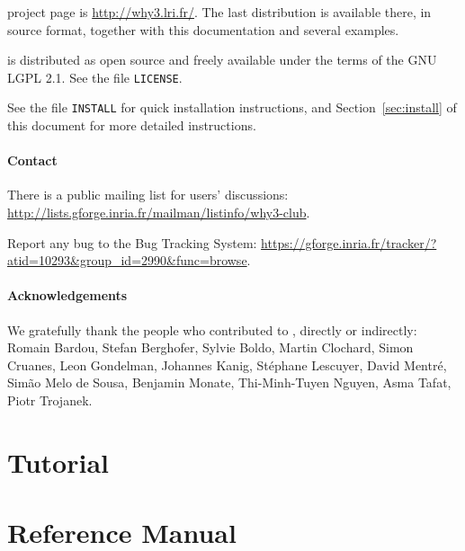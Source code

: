 \documentclass[a4paper,11pt,twoside,openright]{memoir}
\begin{document}
\why project page is \url{http://why3.lri.fr/}.  The last distribution
is available there, in source format, together with this documentation
and several examples.

\why is distributed as open source and freely available under the
terms of the GNU LGPL 2.1. See the file \texttt{LICENSE}.

See the file \texttt{INSTALL} for quick installation instructions, and
Section~\ref{sec:install} of this document for more detailed
instructions.

\subsection*{Contact}

There is a public mailing list for users' discussions:
\url{http://lists.gforge.inria.fr/mailman/listinfo/why3-club}.

Report any bug to the \why Bug Tracking System:
\url{https://gforge.inria.fr/tracker/?atid=10293&group_id=2990&func=browse}.


\subsection*{Acknowledgements}

We gratefully thank the people who contributed to \why, directly or
indirectly: Romain Bardou, Stefan Berghofer, Sylvie Boldo, Martin
Clochard, Simon Cruanes, Leon Gondelman, Johannes Kanig, St\'ephane
Lescuyer, David Mentr\'e, Sim\~ao Melo de Sousa, Benjamin Monate,
Thi-Minh-Tuyen Nguyen, Asma Tafat, Piotr Trojanek.


\cleardoublepage

\tableofcontents

%

\part{Tutorial}





% 





\part{Reference Manual}
\end{document}
